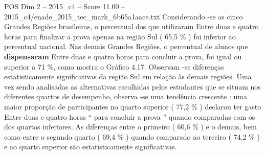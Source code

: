\begin{textsample}{POS Dim 2 – 2015\_c4 – Score 11.00 – 2015\_c4/enade\_2015\_tec\_mark\_6b65a1aace.txt}
Considerando -se as cinco Grandes Regiões brasileiras, o percentual dos que utilizaram Entre duas e quatro horas para finalizar a prova apenas na região Sul ( 65,5 \% ) foi inferior ao percentual nacional.
Nas demais Grandes Regiões, o percentual de alunos que \textbf{dispensaram} Entre duas e quatro horas para concluir a prova, foi igual ou superior a 71 \%, como mostra o Gráfico 4.17.
Observam -se diferenças estatisticamente significativas da região Sul em relação às demais regiões.
Uma vez sendo analisadas as alternativas escolhidas pelos estudantes que se situam nos diferentes quartos de desempenho, observa -se uma tendência crescente : uma maior proporção de participantes no quarto superior ( 77,2 \% ) declarou ter gasto Entre duas e quatro horas “ para concluir a prova ” quando comparadas com os dos quartos inferiores.
As diferenças entre o primeiro ( 60,6 \% ) e o demais, bem como entre o segundo quarto ( 69,4 \% ) quando comparado ao terceiro ( 74,2 \% ) e ao quarto superior são estatisticamente significativas.

\end{textsample}

